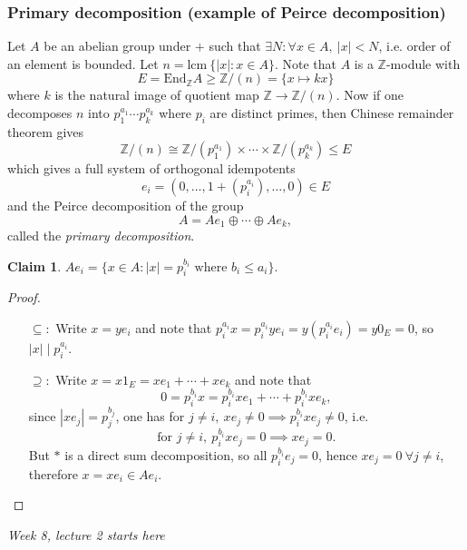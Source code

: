 \documentclass[a4paper]{article}
\newcommand{\Z}{\mathbb{Z}}
\newcommand{\End}{\text{End}}
\newcommand{\lcm}{\text{lcm}\ }
\theoremstyle{definition}
\newtheorem{claim}[defn]{Claim}
\begin{document}
\subsubsection{Primary decomposition (example of Peirce decomposition)}
Let $A$ be an abelian group under $+$ such that $\exists N:\forall x\in A,\ |x|<N$, i.e. order of an element is bounded. Let $n=\lcm\{|x|:x\in A\}$. Note that $A$ is a $\Z$-module with
\[
E=\End_\Z A\geq \Z/(n)=\{x\mapsto kx\}
\]
where $k$ is the natural image of quotient map $\Z\rightarrow \Z/(n)$. Now if one decomposes $n$ into $p_1^{a_1}\cdots p_k^{a_k}$ where $p_i$ are distinct primes, then Chinese remainder theorem gives
\[
\Z/(n)\cong \Z/(p_1^{a_1})\times\cdots\times\Z/(p_k^{a_k})\leq E
\]
which gives a full system of orthogonal idempotents
\[
e_i=(0,\ldots,1+(p_i^{a_i}),\ldots,0)\in E
\]
and the Peirce decomposition of the group
\[
A=Ae_1\oplus\cdots\oplus Ae_k,
\]
called the \textit{primary decomposition}.
\begin{claim}
$Ae_i=\{x\in A:|x|=p_i^{b_i}\text{ where }b_i\leq a_i\}$.
\end{claim}
\begin{proof}
\begin{itemize}
\item[$\subseteq:$] Write $x=ye_i$ and note that $p_i^{a_i}x=p_i^{a_i}ye_i=y(p_i^{a_i}e_i)=y0_E=0$, so $|x|\mid p_i^{a_i}$.
\item[$\supseteq:$] Write $x=x1_E=xe_1+\cdots+xe_k$ and note that
\[
\tag{$\ast$}
0=p_i^{b_i}x=p_i^{b_i}xe_1+\cdots+p_i^{b_i}xe_k,
\]
since $|xe_j|=p_j^{b_j}$, one has for $j\neq i,\ xe_j\neq 0\implies p_i^{b_i}xe_j\neq 0$, i.e.
\[
\text{for }j\neq i,\ p_i^{b_i}xe_j=0\implies xe_j= 0.
\]
But $\ast$ is a direct sum decomposition, so all $p_i^{b_i}e_j=0$, hence $xe_j=0 \ \forall j\neq i$, therefore $x=xe_i\in Ae_i$. 
\end{itemize}
\end{proof}

\begin{flushright}
\textit{Week 8, lecture 2 starts here}
\end{flushright}
\end{document}
